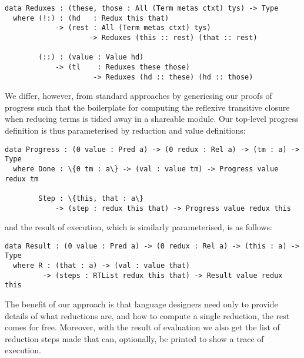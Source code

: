 \begin{Verbatim}
data Reduxes : (these, those : All (Term metas ctxt) tys) -> Type
  where (!:) : (hd   : Redux this that)
            -> (rest : All (Term metas ctxt) tys)
                    -> Reduxes (this :: rest) (that :: rest)

        (::) : (value : Value hd)
            -> (tl    : Reduxes these those)
                     -> Reduxes (hd :: these) (hd :: those)
\end{Verbatim}


We differ, however, from standard approaches by genericsing our proofs of progress such that the boilerplate for computing the reflexive transitive closure when reducing terms is tidied away in a shareable module.
%
Our top-level progress definition is thus parameterised by reduction and value definitions:

\begin{Verbatim}
data Progress : (0 value : Pred a) -> (0 redux : Rel a) -> (tm : a) -> Type
  where Done : \{0 tm : a\} -> (val : value tm) -> Progress value redux tm

        Step : \{this, that : a\}
            -> (step : redux this that) -> Progress value redux this
\end{Verbatim}

\noindent
and the result of execution, which is similarly parameterised, is as follows:

\begin{Verbatim}
data Result : (0 value : Pred a) -> (0 redux : Rel a) -> (this : a) -> Type
  where R : (that : a) -> (val : value that)
         -> (steps : RTList redux this that) -> Result value redux this
\end{Verbatim}

The benefit of our approach is that language designers need only to provide details of what reductions are, and how to compute a single reduction, the rest comes for free.
%
Moreover, with the result of evaluation we also get the list of reduction steps made that can, optionally, be printed to show a trace of execution.

